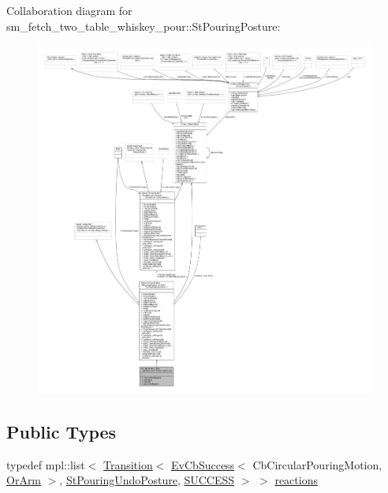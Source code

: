 Collaboration diagram for sm\+\_\+fetch\+\_\+two\+\_\+table\+\_\+whiskey\+\_\+pour\+:\+:St\+Pouring\+Posture\+:
\nopagebreak
\begin{figure}[H]
\begin{center}
\leavevmode
\includegraphics[width=350pt]{structsm__fetch__two__table__whiskey__pour_1_1StPouringPosture__coll__graph}
\end{center}
\end{figure}
\subsection*{Public Types}
\begin{DoxyCompactItemize}
\item 
typedef mpl\+::list$<$ \hyperlink{classsmacc_1_1Transition}{Transition}$<$ \hyperlink{structsmacc_1_1EvCbSuccess}{Ev\+Cb\+Success}$<$ Cb\+Circular\+Pouring\+Motion, \hyperlink{classsm__fetch__two__table__whiskey__pour_1_1OrArm}{Or\+Arm} $>$, \hyperlink{structsm__fetch__two__table__whiskey__pour_1_1StPouringUndoPosture}{St\+Pouring\+Undo\+Posture}, \hyperlink{structsmacc_1_1default__transition__tags_1_1SUCCESS}{S\+U\+C\+C\+E\+SS} $>$ $>$ \hyperlink{structsm__fetch__two__table__whiskey__pour_1_1StPouringPosture_a4cbcbdb61da0bd59a509340474670148}{reactions}
\end{DoxyCompactItemize}
